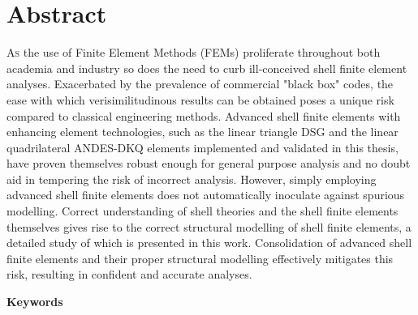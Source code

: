 
\chapter*{Abstract}
\label{cha:abstract}
\lettrine[lines=2]{A}{s} the use of Finite Element Methods (FEMs) proliferate throughout both academia and industry so does the need to curb ill-conceived shell finite element analyses. Exacerbated by the prevalence of commercial "black box" codes, the ease with which verisimilitudinous results can be obtained poses a unique risk compared to classical engineering methods. Advanced shell finite elements with enhancing element technologies, such as the linear triangle DSG and the linear quadrilateral ANDES-DKQ elements implemented and validated in this thesis, have proven themselves robust enough for general purpose analysis and no doubt aid in tempering the risk of incorrect analysis. However, simply employing advanced shell finite elements does not automatically inoculate against spurious modelling. Correct understanding of shell theories and the shell finite elements themselves gives rise to the correct structural modelling of shell finite elements, a detailed study of which is presented in this work. Consolidation of advanced shell finite elements and their proper structural modelling effectively mitigates this risk, resulting in confident and accurate analyses.

\vspace*{10mm}

{\textcolor{gray75}{\Huge\bfseries{Keywords}}}

\vspace*{8mm}

\keywords

\newpage